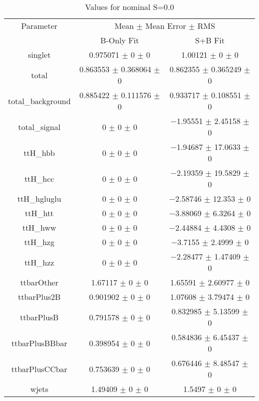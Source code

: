 \begin{table}
\centering
\caption{Values for nominal S=0.0}
\begin{tabular}{ccc}
\toprule
Parameter & \multicolumn{2}{c}{Mean $\pm$ Mean Error $\pm$ RMS}\\
 & B-Only Fit & S+B Fit\\
\midrule
singlet & \num{0.975071} $\pm$ \num{0} $\pm$ \num{0} & \num{1.00121} $\pm$ \num{0} $\pm$ \num{0}\\
total & \num{0.863553} $\pm$ \num{0.368064} $\pm$ \num{0} & \num{0.862355} $\pm$ \num{0.365249} $\pm$ \num{0}\\
total\_background & \num{0.885422} $\pm$ \num{0.111576} $\pm$ \num{0} & \num{0.933717} $\pm$ \num{0.108551} $\pm$ \num{0}\\
total\_signal & \num{0} $\pm$ \num{0} $\pm$ \num{0} & \num{-1.95551} $\pm$ \num{2.45158} $\pm$ \num{0}\\
ttH\_hbb & \num{0} $\pm$ \num{0} $\pm$ \num{0} & \num{-1.94687} $\pm$ \num{17.0633} $\pm$ \num{0}\\
ttH\_hcc & \num{0} $\pm$ \num{0} $\pm$ \num{0} & \num{-2.19359} $\pm$ \num{19.5829} $\pm$ \num{0}\\
ttH\_hgluglu & \num{0} $\pm$ \num{0} $\pm$ \num{0} & \num{-2.58746} $\pm$ \num{12.353} $\pm$ \num{0}\\
ttH\_htt & \num{0} $\pm$ \num{0} $\pm$ \num{0} & \num{-3.88069} $\pm$ \num{6.3264} $\pm$ \num{0}\\
ttH\_hww & \num{0} $\pm$ \num{0} $\pm$ \num{0} & \num{-2.44884} $\pm$ \num{4.4308} $\pm$ \num{0}\\
ttH\_hzg & \num{0} $\pm$ \num{0} $\pm$ \num{0} & \num{-3.7155} $\pm$ \num{2.4999} $\pm$ \num{0}\\
ttH\_hzz & \num{0} $\pm$ \num{0} $\pm$ \num{0} & \num{-2.28477} $\pm$ \num{1.47409} $\pm$ \num{0}\\
ttbarOther & \num{1.67117} $\pm$ \num{0} $\pm$ \num{0} & \num{1.65591} $\pm$ \num{2.60977} $\pm$ \num{0}\\
ttbarPlus2B & \num{0.901902} $\pm$ \num{0} $\pm$ \num{0} & \num{1.07608} $\pm$ \num{3.79474} $\pm$ \num{0}\\
ttbarPlusB & \num{0.791578} $\pm$ \num{0} $\pm$ \num{0} & \num{0.832985} $\pm$ \num{5.13599} $\pm$ \num{0}\\
ttbarPlusBBbar & \num{0.398954} $\pm$ \num{0} $\pm$ \num{0} & \num{0.584836} $\pm$ \num{6.45437} $\pm$ \num{0}\\
ttbarPlusCCbar & \num{0.753639} $\pm$ \num{0} $\pm$ \num{0} & \num{0.676446} $\pm$ \num{8.48547} $\pm$ \num{0}\\
wjets & \num{1.49409} $\pm$ \num{0} $\pm$ \num{0} & \num{1.5497} $\pm$ \num{0} $\pm$ \num{0}\\
\bottomrule
\end{tabular}
\end{table}